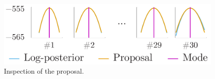 \begin{figure}
  \centering
  \includegraphics[width=0.8\linewidth]{include/figures/proposal.pdf}
  \caption{Inspection of the proposal.}
  \vspace{-1.5em}
\end{figure}
